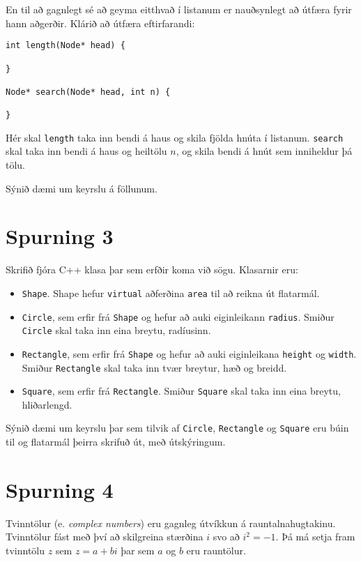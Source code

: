 \documentclass{article}
\begin{document}
En til að gagnlegt sé að geyma eitthvað í listanum er nauðsynlegt að útfæra fyrir hann aðgerðir. Klárið að útfæra eftirfarandi:

\begin{verbatim}
int length(Node* head) {

}

Node* search(Node* head, int n) {

}
\end{verbatim}

Hér skal \texttt{length} taka inn bendi á haus og skila fjölda hnúta í listanum. \texttt{search} skal taka inn bendi á haus og heiltölu $n$, og skila bendi á hnút sem inniheldur þá tölu.

Sýnið dæmi um keyrslu á föllunum.

\section{Spurning 3}

Skrifið fjóra C++ klasa þar sem erfðir koma við sögu. Klasarnir eru: 

\begin{itemize}
 \item \texttt{Shape}. Shape hefur \texttt{virtual} aðferðina \texttt{area} til að reikna út flatarmál.
 \item \texttt{Circle}, sem erfir frá \texttt{Shape} og hefur að auki eiginleikann \texttt{radius}. Smiður \texttt{Circle} skal taka inn eina breytu, radíusinn.
 \item \texttt{Rectangle}, sem erfir frá \texttt{Shape} og hefur að auki eiginleikana \texttt{height} og \texttt{width}. Smiður \texttt{Rectangle} skal taka inn tvær breytur, hæð og breidd.
 \item \texttt{Square}, sem erfir frá \texttt{Rectangle}. Smiður \texttt{Square} skal taka inn eina breytu, hliðarlengd.
\end{itemize}
Sýnið dæmi um keyrslu þar sem tilvik af \texttt{Circle}, \texttt{Rectangle} og \texttt{Square} eru búin til og flatarmál þeirra skrifuð út, með útskýringum.

\newpage

\section{Spurning 4}
Tvinntölur (e. \emph{complex numbers}) eru gagnleg útvíkkun á rauntalnahugtakinu. Tvinntölur fást með því að skilgreina stærðina $i$ svo að $i^2 = -1$. Þá má setja fram tvinntölu $z$ sem $z = a+bi$ þar sem $a$ og $b$ eru rauntölur.
\end{document}
